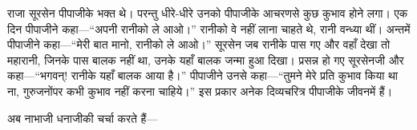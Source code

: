 \begin{sloppypar}\justifying{}
राजा सूरसेन पीपाजीके भक्त थे। परन्तु धीरे-धीरे उनको पीपाजीके आचरणसे कुछ कुभाव होने लगा। एक दिन पीपाजीने कहा—“अपनी रानीको ले आओ।” रानीको वे नहीं लाना चाहते थे, रानी वन्ध्या थीं। अन्तमें पीपाजीने कहा—“मेरी बात मानो, रानीको ले आओ।” सूरसेन जब रानीके पास गए और वहाँ देखा तो महारानी, जिनके पास बालक नहीं था, उनके यहाँ बालक जन्मा हुआ दिखा। प्रसन्न हो गए सूरसेनजी और कहा—“भगवन्! रानीके यहाँ बालक आया है।” पीपाजीने उनसे कहा—“तुमने मेरे प्रति कुभाव किया था ना, गुरुजनोंपर कभी कुभाव नहीं करना चाहिये।” इस प्रकार अनेक दिव्यचरित्र पीपाजीके जीवनमें हैं।
\end{sloppypar}
\begin{sloppypar}\justifying{}
अब नाभाजी धनाजीकी चर्चा करते हैं—
\end{sloppypar}


